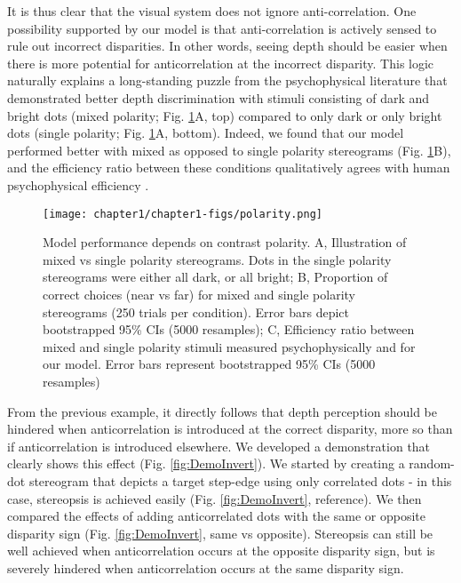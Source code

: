 It is thus clear that the visual system does not ignore anti-correlation. One possibility supported by our model is that anti-correlation is actively sensed to rule out incorrect disparities. In other words, seeing depth should be easier when there is more potential for anticorrelation at the incorrect disparity. This logic naturally explains a long-standing puzzle from the psychophysical literature \cite{Harris1995,Read:2011ix} that demonstrated better depth discrimination with stimuli consisting of dark and bright dots (mixed polarity; Fig. \ref{fig:Polarity}A, top) compared to only dark or only bright dots (single polarity; Fig. \ref{fig:Polarity}A, bottom). Indeed, we found that our model performed better with mixed as opposed to single polarity stereograms (Fig. \ref{fig:Polarity}B), and the efficiency ratio between these conditions qualitatively agrees with human psychophysical efficiency \cite{Harris1995}.

\begin{figure}
  \centering
  \texttt{[image: chapter1/chapter1-figs/polarity.png]}
  \caption[Model performance depends on contrast polarity.]{Model performance depends on contrast polarity. A, Illustration of mixed vs single polarity stereograms. Dots in the single polarity stereograms were either all dark, or all bright; B, Proportion of correct choices (near vs far) for mixed and single polarity stereograms (250 trials per condition). Error bars depict bootstrapped 95\% CIs (5000 resamples); C, Efficiency ratio between mixed and single polarity stimuli measured psychophysically \cite{Harris1995} and for our model. Error bars represent bootstrapped 95\% CIs (5000 resamples)}
  \label{fig:Polarity}
\end{figure}

From the previous example, it directly follows that depth perception should be hindered when anticorrelation is introduced at the correct disparity, more so than if anticorrelation is introduced elsewhere. We developed a demonstration that clearly shows this effect (Fig. \ref{fig:DemoInvert}). We started by creating a random-dot stereogram that depicts a target step-edge using only correlated dots - in this case, stereopsis is achieved easily (Fig. \ref{fig:DemoInvert}, reference). We then compared the effects of adding anticorrelated dots with the same or opposite disparity sign (Fig. \ref{fig:DemoInvert}, same vs opposite). Stereopsis can still be well achieved when anticorrelation occurs at the opposite disparity sign, but is severely hindered when anticorrelation occurs at the same disparity sign.

